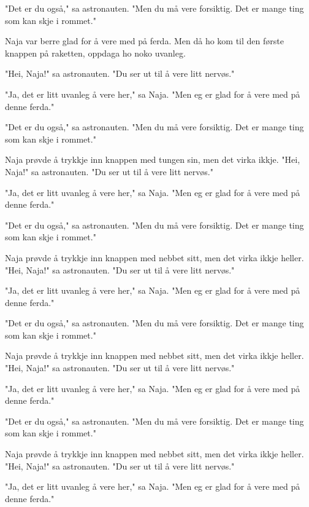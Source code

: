 \documentclass[10pt]{article}
\begin{document}
{\begin{minipage}{\textwidth}
\par\smallskip
"Det er du også," sa astronauten. "Men du må vere forsiktig. Det er mange ting som kan skje i rommet."
\par\smallskip
Naja var berre glad for å vere med på ferda. Men då ho kom til den første knappen på raketten, oppdaga ho noko uvanleg.
\par\smallskip
"Hei, Naja!" sa astronauten. "Du ser ut til å vere litt nervøs."
\par\smallskip
"Ja, det er litt uvanleg å vere her," sa Naja. "Men eg er glad for å vere med på denne ferda."
\par\smallskip
"Det er du også," sa astronauten. "Men du må vere forsiktig. Det er mange ting som kan skje i rommet."
\par\smallskip
Naja prøvde å trykkje inn knappen med tungen sin, men det virka ikkje. "Hei, Naja!" sa astronauten. "Du ser ut til å vere litt nervøs."
\par\smallskip
"Ja, det er litt uvanleg å vere her," sa Naja. "Men eg er glad for å vere med på denne ferda."
\par\smallskip
"Det er du også," sa astronauten. "Men du må vere forsiktig. Det er mange ting som kan skje i rommet."
\par\smallskip
Naja prøvde å trykkje inn knappen med nebbet sitt, men det virka ikkje heller. "Hei, Naja!" sa astronauten. "Du ser ut til å vere litt nervøs."
\par\smallskip
"Ja, det er litt uvanleg å vere her," sa Naja. "Men eg er glad for å vere med på denne ferda."
\par\smallskip
"Det er du også," sa astronauten. "Men du må vere forsiktig. Det er mange ting som kan skje i rommet."
\par\smallskip
Naja prøvde å trykkje inn knappen med nebbet sitt, men det virka ikkje heller. "Hei, Naja!" sa astronauten. "Du ser ut til å vere litt nervøs."
\par\smallskip
"Ja, det er litt uvanleg å vere her," sa Naja. "Men eg er glad for å vere med på denne ferda."
\par\smallskip
"Det er du også," sa astronauten. "Men du må vere forsiktig. Det er mange ting som kan skje i rommet."
\par\smallskip
Naja prøvde å trykkje inn knappen med nebbet sitt, men det virka ikkje heller. "Hei, Naja!" sa astronauten. "Du ser ut til å vere litt nervøs."
\par\smallskip
"Ja, det er litt uvanleg å vere her," sa Naja. "Men eg er glad for å vere med på denne ferda."

\end{minipage}}
\end{document}
